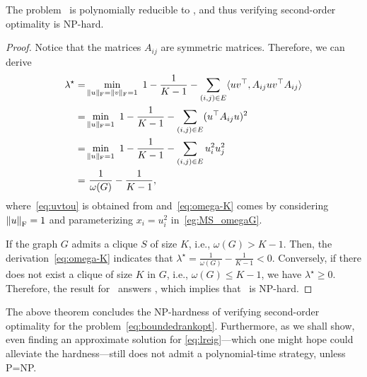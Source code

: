 \begin{theorem}[NP-hardness]\label{the:np}
The problem \clique\ is polynomially reducible to \verifysec, and thus verifying second-order optimality is NP-hard.
\end{theorem}
\begin{proof}
    Notice that the matrices $A_{ij}$ are symmetric matrices. Therefore, we can derive
    \begin{align}
            \lambda^\star=&\min_{\|u\|_\frob = \|v\|_\frob = 1}\ 1-\frac{1}{K-1} - \sum_{(i,j)\in E} \innerp{uv^\top,A_{ij}uv^\top A_{ij}}  \nonumber
            \\
            =&\min_{\|u\|_\frob = 1}\ 1-\frac{1}{K-1} - \sum_{(i,j)\in E} (u^\top A_{ij}u)^2    \label{eq:uvtou}
            \\
            =&\min_{\|u\|_\frob = 1}\ 1-\frac{1}{K-1} - \sum_{(i,j)\in E} u_i^2u_j^2    \nonumber
            \\
            =&\ \frac{1}{\omega(G)} - \frac{1}{K-1},      \label{eq:omega-K}
    \end{align}
    where~\eqref{eq:uvtou} is obtained from \cite[Proposition~2]{he2010approximationhomogeneous} and~\eqref{eq:omega-K} comes by considering $\left\| {u} \right\|_{\mathrm{F}}=1$ and parameterizing $x_i=u_i^2$ in~\eqref{eg:MS_omegaG}.
    
    If the graph $G$ admits a clique $S$ of size $K$, i.e., $\omega(G)>K-1$. Then, the derivation~\eqref{eq:omega-K} indicates that $\lambda^\star=\frac{1}{\omega(G)}-\frac{1}{K-1}<0$. Conversely, if there does not exist a clique of size $K$ in $G$, i.e., $\omega(G)\le K-1$, we have $\lambda^\star\ge 0$. Therefore, the result for \verifysec\ answers \clique, which implies that \verifysec\ is NP-hard.
\end{proof} 

The above theorem concludes the NP-hardness of verifying second-order optimality for the problem~\eqref{eq:boundedrankopt}. Furthermore, as we shall show, even finding an approximate solution for \eqref{eq:lreig}---which one might hope could alleviate the hardness---still does not admit a polynomial-time strategy, unless P=NP. 

